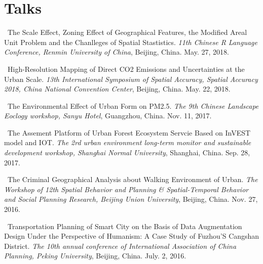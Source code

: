 \section*{Talks}
\begin{etaremune}
\item
    \Shaoqing\
    The Scale Effect, Zoning Effect of Geographical Features, the Modified Areal Unit Problem and the Chanlleges of Spatial Stastistics.
    \textit{11th Chinese R Language Conference, Renmin University of China}, Beijing, China.
    May. 27, 2018.
\item
    \Shaoqing\
    High-Resolution Mapping of Direct CO2 Emissions and Uncertainties at the Urban Scale.
    \textit{13th International Symposium of Spatial Accuracy, Spatial Accuracy 2018, China National Convention Center}, Beijing, China.
    May. 22, 2018.
\item
    \Shaoqing\
    The Environmental Effect of Urban Form on PM2.5. 
    \textit{The 9th Chinese Landscape Eoclogy workshop, Sanyu Hotel}, Guangzhou, China.
    Nov. 11, 2017.
\item
    \Shaoqing\
    The Assement Platform of Urban Forest Ecosystem Servcie Based on InVEST model and IOT.
    \textit{The 2rd urban environment long-term monitor and sustainable development workshop, Shanghai Normal University}, Shanghai, China.
    Sep. 28, 2017.
    \invited
\item
    \Shaoqing\
    The Criminal Geographical Analysis about Walking Environment of Urban.
    \textit{The Workshop of 12th Spatial Behavior and Planning \& Spatial-Temporal Behavior and Social Planning Research, Beijing Union University}, Beijing, China.
    Nov. 27, 2016.
\item
    \Shaoqing\
    Transportation Planning of Smart City on the Basis of Data Augmentation Design Under the Perspective of Humanism: A Case Study of Fuzhou’S Cangshan District.
    \textit{The 10th annual conference of International Association of China Planning, Peking University}, Beijing, China.
    July. 2, 2016.
\end{etaremune}
